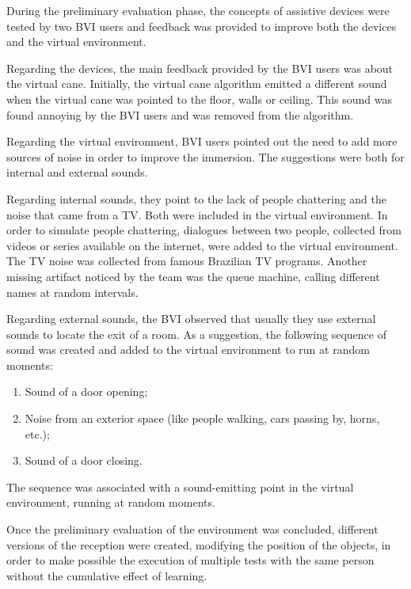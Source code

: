         During the preliminary evaluation phase, the concepts of assistive devices were tested by two BVI users and feedback was provided to improve both the devices and the virtual environment. 

        Regarding the devices, the main feedback provided by the BVI users was about the virtual cane. Initially, the virtual cane algorithm emitted a different sound when the virtual cane was pointed to the floor, walls or ceiling. This sound was found annoying by the BVI users and was removed from the algorithm.

        Regarding the virtual environment, BVI users pointed out the need to add more sources of noise in order to improve the immersion. The suggestions were both for internal and external sounds.
        
        Regarding internal sounds, they point to the lack of people chattering and the noise that came from a TV. Both were included in the virtual environment. In order to simulate people chattering, dialogues between two people, collected from videos or series available on the internet, were added to the virtual environment. The TV noise was collected from famous Brazilian TV programs. Another missing artifact noticed by the team was the queue machine, calling different names at random intervals. 

        Regarding external sounds, the BVI observed that usually they use external sounds to locate the exit of a room. As a suggestion, the following sequence of sound was created and added to the virtual environment to run at random moments:

        \begin{enumerate}
            \item Sound of a door opening;
            \item Noise from an exterior space (like people walking, cars passing by, horns, etc.);
            \item Sound of a door closing.
        \end{enumerate}
        
        The sequence was associated with a sound-emitting point in the virtual environment, running at random moments. 

        Once the preliminary evaluation of the environment was concluded, different versions of the reception were created, modifying the position of the objects, in order to make possible the execution of multiple tests with the same person without the cumulative effect of learning. 

